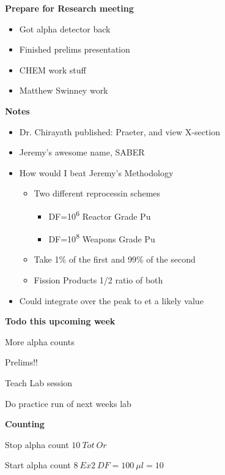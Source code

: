 \documentclass[idxtotoc,hyperref,openany,oneside]{labbook} %
\newcommand{\cmark}{\ding{51}}%
\newcommand{\done}{\rlap{$\square$}{\raisebox{2pt}{\large\hspace{1pt}\cmark}}%
  \hspace{-2.5pt}}
\newcommand{\tss}{\textsuperscript}
\begin{document}
\textbf{Prepare for Research meeting}
\begin{itemize}
\item{Got alpha detector back}
\item{Finished prelims presentation}
\item{CHEM work stuff}
\item{Matthew Swinney work}
\end{itemize}
\textbf{Notes}
\begin{itemize}
\item{Dr. Chirayath published: Praeter, and view X-section}
\item{Jeremy's awesome name, SABER}
\item{How would I beat Jeremy's Methodology}
  \begin{itemize}
  \item{Two different reprocessin schemes}
    \begin{itemize}
    \item{DF=10\tss{6} Reactor Grade Pu}
    \item{DF=10\tss{8} Weapons Grade Pu}
    \end{itemize}
  \item{Take 1\% of the first and 99\% of the second}
  \item{Fission Products 1/2 ratio of both}
  \end{itemize}
\item{Could integrate over the peak to et a likely value}
\end{itemize}
\textbf{Todo this upcoming week}
\begin{todolist}
\item{More alpha counts}
\item{Prelims!!}
\end{todolist}







\begin{todolist}
\item[\done]{Teach Lab session}
\item[\done]{Do practice run of next weeks lab}
\end{todolist}


\textbf{Counting}
\begin{todolist}
\item[\done]{Stop alpha count $\boxed{10\ Tot\ Or}$}
\item[\done]{Start alpha count $\boxed{8\ Ex2\ DF=100\ \mu l=10}$}
\end{todolist}
\end{document}
